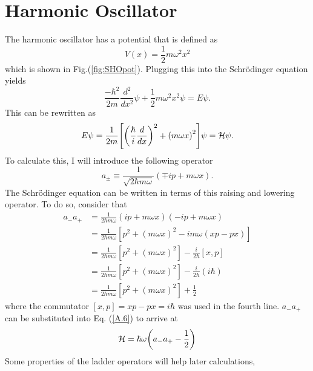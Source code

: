 \section{Harmonic Oscillator}
The harmonic oscillator has a potential that is defined as 
\begin{equation}
    V(x)=\frac{1}{2}m\omega^2 x^2
\end{equation}
which is shown in Fig.(\ref{fig:SHOpot}). 
Plugging this into the Schr\"odinger equation yields
\begin{equation}
    \frac{-\hbar^2}{2m}\frac{d^2}{dx^2}\psi+\frac{1}{2}m\omega^2 x^2\psi=E\psi.
\end{equation}
This can be rewritten as 
\begin{equation}
    E\psi=\frac{1}{2m}\qty[\qty(\frac{\hbar}{i}\frac{d}{dx})^2+\qty(m\omega x)^2]\psi=\mathcal{H}\psi. \label{A.6}
\end{equation}
To calculate this, I will introduce the following operator
\begin{equation}
    a_{\pm}\equiv \frac{1}{\sqrt{2\hbar m \omega}} (\mp ip+m\omega x).
\end{equation}
The Schr\"odinger equation can be written in terms of this raising and lowering operator. To do so, consider that
\begin{align}
    a_-a_+&=\frac{1}{2\hbar m\omega} (ip+m\omega x)(-ip+m\omega x)\nonumber\\
    &=\frac{1}{2\hbar m\omega} [p^2+(m\omega x)^2-im\omega (xp-px)]\nonumber\\
    &=\frac{1}{2\hbar m\omega} [p^2+(m\omega x)^2]-\frac{i}{2\hbar}[x,p]\nonumber\\
    &=\frac{1}{2\hbar m\omega} [p^2+(m\omega x)^2]-\frac{i}{2\hbar}(i\hbar)\nonumber\\
    &=\frac{1}{2\hbar m\omega} [p^2+(m\omega x)^2]+\frac{1}{2}
\end{align}
where the commutator $[x,p]=xp-px=i\hbar$ was used in the fourth line. $a_-a_+$ can be substituted into Eq. (\ref{A.6}) to arrive at 
\begin{equation}
    \mathcal{H}=\hbar\omega\qty(a_-a_+-\frac{1}{2})
\end{equation}
Some properties of the ladder operators will help later calculations,
